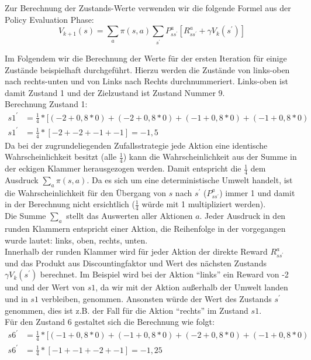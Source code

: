 \documentclass[10pt]{scrartcl}
\begin{document}
Zur Berechnung der Zustands-Werte verwenden wir die folgende Formel aus der Policy Evaluation Phase:
\begin{equation}
V_{k+1}(s) = \sum_{a} \pi(s,a) \sum_{s^{'}} P^a_{ss^{'}} [R^a_{ss^{'}} + \gamma V_{k} (s^{'})]
\end{equation}

Im Folgendem wir die Berechnung der Werte für der ersten Iteration für einige Zustände beispielhaft durchgeführt.
Hierzu werden die Zustände von links-oben nach rechts-unten und von Links nach Rechts durchnummeriert.
Links-oben ist damit Zustand 1 und der Zielzustand ist Zustand Nummer 9.\\

Berechnung Zustand 1:
\begin{align}
	s1^{'} &= \frac{1}{4} * [(-2 + 0,8 * 0) + (-2 + 0,8 * 0) + (-1 + 0,8 * 0) + (-1 + 0,8 * 0)\\
	s1^{'} &= \frac{1}{4} * [ -2 + -2 + -1 + -1 ] = -1,5
\end{align}
Da bei der zugrundeliegenden Zufallsstrategie jede Aktion eine identische Wahrscheinlichkeit besitzt (alle $\frac{1}{4}$) kann die Wahrscheinlichkeit aus der Summe in der eckigen Klammer herausgezogen werden.
Damit entspricht die $\frac{1}{4}$ dem Ausdruck $\sum_{a} \pi(s,a)$. 
Da es sich um eine deterministische Umwelt handelt, ist die Wahrscheinlichkeit für den Übergang von $s$ nach $s^{'}$ ($P^a_{ss^{'}}$) immer 1 und damit in der Berechnung nicht ersichtlich ($\frac{1}{4}$ würde mit 1 multipliziert werden).\\
Die Summe $\sum_{a}$ stellt das Auswerten aller Aktionen $a$.
Jeder Ausdruck in den runden Klammern entspricht einer Aktion, die Reihenfolge in der vorgegangen wurde lautet: links, oben, rechts, unten.\\
Innerhalb der runden Klammer wird für jeder Aktion der direkte Reward $R^a_{ss^{'}}$ und das Produkt aus Discountingfaktor und Wert des nächsten Zustands $\gamma V_{k} (s^{'})$ berechnet.
Im Beispiel wird bei der Aktion "`links"' ein Reward von -2 und und der Wert von $s1$, da wir mit der Aktion außerhalb der Umwelt landen und in $s1$ verbleiben, genommen.
Ansonsten würde der Wert des Zustands $s^{'}$ genommen, dies ist z.B. der Fall für die Aktion "`rechts"' im Zustand $s1$.\\

Für den Zustand 6 gestaltet sich die Berechnung wie folgt:
\begin{align}
	s6^{'} &= \frac{1}{4} * [(-1 + 0,8 * 0) + (-1 + 0,8 * 0) + (-2 + 0,8 * 0) + (-1 + 0,8 * 0)\\
	s6^{'} &= \frac{1}{4} * [ -1 + -1 + -2 + -1 ] = -1,25
\end{align}
\end{document}
